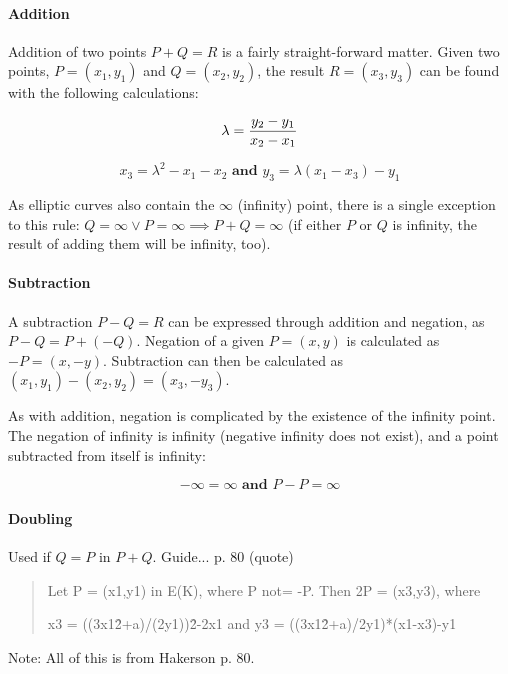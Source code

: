 \paragraph{Addition}

Addition of two points \(P + Q = R\) is a fairly straight-forward matter. Given two points, \(P = (x_1,y_1)\) and
\(Q = (x_2,y_2)\), the result \(R = (x_3,y_3)\) can be found with the following calculations:

\begin{equation}
	\lambda = {{y_2-y_1} \over {x_2-x_1}}
\end{equation}

\begin{equation}
	x_3 = \lambda^2 - x_1 - x_2 \textbf{ and } y_3 = \lambda (x_1 - x_3) - y_1
\end{equation}

As elliptic curves also contain the \(\infty\) (infinity) point, there is a single exception to this
rule: \(Q = \infty \lor P = \infty \implies P + Q = \infty\) (if either \(P\) or \(Q\) is infinity,
the result of adding them will be infinity, too).

\paragraph{Subtraction}

A subtraction \(P - Q = R\) can be expressed through addition and negation, as \(P - Q = P + (-Q)\). Negation of a given
\(P = (x,y)\) is calculated as \(-P = (x,-y)\). Subtraction can then be calculated as \((x_1,y_1) - (x_2,y_2) = (x_3,-y_3)\).

As with addition, negation is complicated by the existence of the infinity point. The negation of infinity is infinity (negative
infinity does not exist), and a point subtracted from itself is infinity:

\begin{equation}
	-\infty = \infty \textbf{ and } P - P = \infty
\end{equation}

\paragraph{Doubling}

Used if \(Q = P\) in \(P + Q\). Guide... p. 80 (quote)
\begin{quote}
	Let P = (x1,y1) in E(K), where P not= -P. Then 2P = (x3,y3), where
	
	x3 = ((3x1\^2+a)/(2y1))\^2-2x1    and    y3 = ((3x1\^2+a)/2y1)*(x1-x3)-y1
\end{quote}

Note: All of this is from Hakerson p. 80.